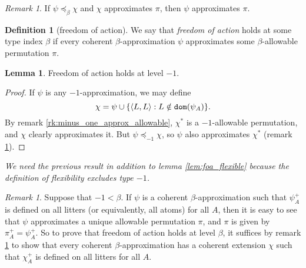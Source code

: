 \documentclass[112pt]{article}
\theoremstyle{definition}
\newtheorem{lemma}[theorem]{Lemma}
\newtheorem{definition}[theorem]{Definition}
\theoremstyle{remark}
\newtheorem{remark}[theorem]{Remark}
\newenvironment{annot}{\begin{center}\color{blue}\sl}{\end{center}}
\begin{document}
\begin{remark}\label{rk:preceq_approximates}
  If $\psi \preceq_\beta \chi$ and $\chi$ approximates $\pi$, then $\psi$ approximates $\pi$.
\end{remark}
\begin{definition}[freedom of action]\label{def:foa}
  We say that {\em freedom of action\/} holds at some type index $\beta$ if every coherent $\beta$-approximation $\psi$ approximates some $\beta$-allowable permutation $\pi$.
\end{definition}
\begin{lemma}\label{lem:foa_minus_one}
  Freedom of action holds at level $-1$.
\end{lemma}
\begin{proof}
  If $\psi$ is any $-1$-approximation, we may define
  $$ \chi = \psi \cup \{ \langle L, L \rangle : L \notin {\tt dom}(\psi_A) \}. $$
  By remark \ref{rk:minus_one_approx_allowable}, $\chi^*$ is a $-1$-allowable permutation, and $\chi$ clearly approximates it.
  But $\psi \preceq_{-1} \chi$, so $\psi$ also approximates $\chi^*$ (remark \ref{rk:preceq_approximates}).
\end{proof}
\begin{annot}
  We need the previous result in addition to lemma \ref{lem:foa_flexible} because the definition of flexibility excludes type $-1$.
\end{annot}
\begin{remark}\label{rk:foa_suffices}
  Suppose that $-1 < \beta$.
  If $\psi$ is a coherent $\beta$-approximation such that $\psi_A^+$ is defined on all litters (or equivalently, all atoms) for all $A$, then it is easy to see that $\psi$ approximates a unique allowable permutation $\pi$, and $\pi$ is given by $\pi_A^+ = \psi_A^+$.
  So to prove that freedom of action holds at level $\beta$, it suffices by remark \ref{rk:preceq_approximates} to show that every coherent $\beta$-approximation has a coherent extension $\chi$ such that $\chi_A^+$ is defined on all litters for all $A$.
\end{remark}
\end{document}
